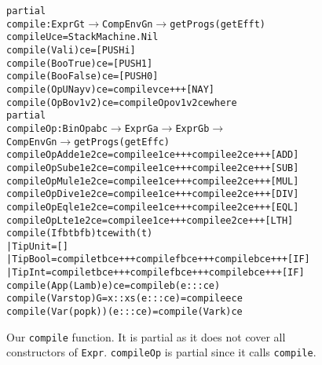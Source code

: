 \begin{figure}
\begin{alltt}
partial
compile : Expr G t \(\to\) CompEnv G n \(\to\) getProg s (getEff t)
compile U                 ce    = StackMachine.Nil
compile (Val i)           ce    = [PUSH i]
compile (Boo True)        ce    = [PUSH 1]
compile (Boo False)       ce    = [PUSH 0]
compile (OpU Nay v)       ce    = compile v ce +++ [NAY]
compile (OpB o v1 v2) ce = compileOp o v1 v2 ce where
  partial 
  compileOp : BinOp a b c \(\to\) Expr G a \(\to\) Expr G b \(\to\) 
              CompEnv G n \(\to\) getProg s (getEff c)
  compileOp Add e1 e2 ce = compile e1 ce +++ compile e2 ce +++ [ADD]
  compileOp Sub e1 e2 ce = compile e1 ce +++ compile e2 ce +++ [SUB]
  compileOp Mul e1 e2 ce = compile e1 ce +++ compile e2 ce +++ [MUL]
  compileOp Div e1 e2 ce = compile e1 ce +++ compile e2 ce +++ [DIV]
  compileOp Eql e1 e2 ce = compile e1 ce +++ compile e2 ce +++ [EQL]
  compileOp Lt  e1 e2 ce = compile e1 ce +++ compile e2 ce +++ [LTH]
compile (If b tb fb) {t} ce with (t)
  | TipUnit = []
  | TipBool = compile tb ce +++ compile fb ce +++ compile b ce +++ [IF]
  | TipInt  = compile tb ce +++ compile fb ce +++ compile b ce +++ [IF]
compile (App (Lam b) e) ce = compile b (e ::: ce)
compile (Var stop) {G = x :: xs} (e ::: ce) = compile e ce
compile (Var (pop k)) (e ::: ce) = compile (Var k) ce
\end{alltt}
\label{fig:compile_function}
\caption{Our \texttt{compile} function. It is partial as it does not cover all constructors of \texttt{Expr}. \texttt{compileOp} is partial since it calls \texttt{compile}.}
\end{figure}
